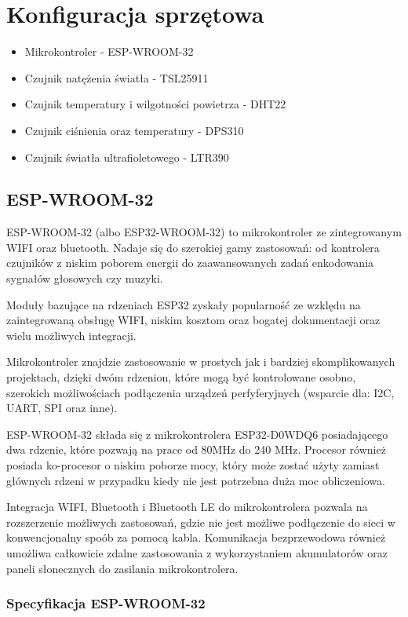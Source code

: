 \documentclass[12pt,a4paper]{article}
\begin{document}
\section{Konfiguracja sprzętowa}

\begin{itemize}
    \item Mikrokontroler - ESP-WROOM-32
    \item Czujnik natężenia światła - TSL25911
    \item Czujnik temperatury i wilgotności powietrza - DHT22
    \item Czujnik ciśnienia oraz temperatury - DPS310
    \item Czujnik światła ultrafioletowego - LTR390
\end{itemize}

\subsection{ESP-WROOM-32}
ESP-WROOM-32 (albo ESP32-WROOM-32) to mikrokontroler ze zintegrowanym WIFI oraz bluetooth. Nadaje się do szerokiej gamy zastosowań:
od kontrolera czujników z niskim poborem energii do zaawansowanych zadań enkodowania sygnałów głosowych czy muzyki.

Moduły bazujące na rdzeniach ESP32 zyskały popularność ze wzklędu na zaintegrowaną obsługę WIFI, 
niskim kosztom oraz bogatej dokumentacji oraz wielu możliwych integracji.

Mikrokontroler znajdzie zastosowanie w prostych jak i bardziej skomplikowanych projektach, dzięki dwóm rdzenion, które mogą być kontrolowane osobno,
szerokich możliwościach podłączenia urządzeń perfyferyjnych (wsparcie dla: I2C, UART, SPI oraz inne).

ESP-WROOM-32 składa się z mikrokontrolera ESP32-D0WDQ6 posiadającego dwa rdzenie, które pozwają na prace od 80MHz do 240 MHz. Procesor również
posiada ko-procesor o niskim poborze mocy, który może zostać użyty zamiast głównych rdzeni w przypadku kiedy nie jest potrzebna duża moc obliczeniowa.

Integracja WIFI, Bluetooth i Bluetooth LE do mikrokontrolera pozwala na rozszerzenie możliwych zastosowań, gdzie nie jest możliwe podłączenie do sieci
w konwencjonalny spoób za pomocą kabla. Komunikacja bezprzewodowa również umożliwa całkowicie zdalne zastosowania z wykorzystaniem akumulatorów
oraz paneli słonecznych do zasilania mikrokontrolera.

\subsubsection{Specyfikacja ESP-WROOM-32}
\end{document}
